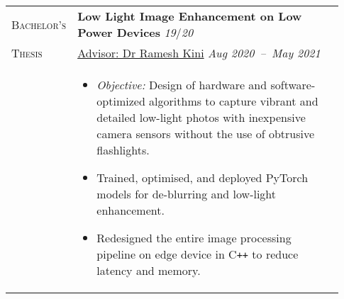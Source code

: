 \documentclass[letterpaper, 10pt, oneside]{article}
\newcommand{\stitle}[1]{\normalsize{\textsc{#1}}}
\newcommand{\bdit}[1]{{\textbf{#1}}}
\begin{document}
\begin{longtable}{@{} p{0.13\linewidth} p{0.8\linewidth}}

    \stitle{Bachelor's}  & \bdit{Low Light Image Enhancement on Low Power Devices} \hfill \textsl{19}/\textsl{20}                                                                                    \\
    \stitle{Thesis}      & \href{https://ece.nitk.ac.in/faculty/ramesh-kini-m}{Advisor: Dr Ramesh Kini} \hfill \textsl{Aug 2020\ --\ May 2021}                                                       \\
                         & \parbox{0.8\textwidth}{                                                                                                                                                   %
        \begin{itemize}[leftmargin=*, itemsep=-0.70ex, topsep=-0.88ex]
            \item \textsl{Objective:} Design of hardware and software-optimized algorithms to capture vibrant and detailed low-light photos with inexpensive camera sensors without the use of obtrusive flashlights.
            \item Trained, optimised, and deployed PyTorch models for de-blurring and low-light enhancement.
            \item Redesigned the entire image processing pipeline on edge device in C\texttt{++} to reduce latency and memory.
        \end{itemize}
    }
    \\
    \\


\end{longtable}
\end{document}
